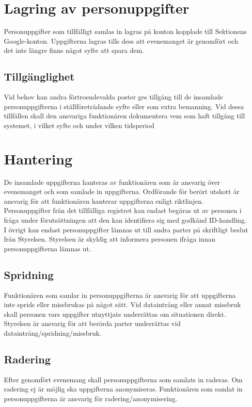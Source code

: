 \documentclass{dsekprotokoll}
\begin{document}
\section{Lagring av personuppgifter}
Personuppgifter som tillfälligt samlas in lagras på konton kopplade till Sektionens Google-konton. Uppgifterna lagras tills dess att evenemanget är genomfört och det inte längre finns något syfte att spara dem.

\subsection{Tillgänglighet}

Vid behov kan andra förtroendevalda poster ges tillgång till de insamlade personuppgifterna i ställföreträdande syfte eller som extra bemanning. Vid dessa tillfällen skall den ansvariga funktionären dokumentera vem som haft tillgång till systemet, i vilket syfte och under vilken tidsperiod

\section{Hantering}
De insamlade uppgifterna hanteras av funktionären som är ansvarig över evenemanget och som samlade
in uppgifterna. Ordförande för berört utskott är ansvarig för att funktionären hanterar uppgifterna enligt riktlinjen. Personuppgifter från det tillfälliga registret kan endast begäras ut av personen i fråga under förutsättningen att den kan identifiera sig med godkänd ID-handling. I övrigt kan endast personuppgifter lämnas ut till andra parter på skriftligt beslut från Styrelsen. Styrelsen är skyldig att informera personen ifråga innan personuppgifterna lämnas ut.

\subsection{Spridning}
Funktionären som samlar in personuppgifterna är ansvarig för att uppgifterna inte sprids eller missbrukas på något sätt. Vid dataintrång eller annat missbruk skall personen vars uppgifter utnyttjats underrättas om situationen direkt. Styrelsen är ansvarig för att berörda parter underrättas vid dataintrång/spridning/missbruk.

\subsection{Radering}
Efter genomfört evenemang skall personuppgifterna som samlats in raderas. Om radering ej är möjlig ska
uppgifterna anonymiseras. Funktionären som samlat in personuppgifterna är ansvarig för
radering/anonymisering.
\end{document}
